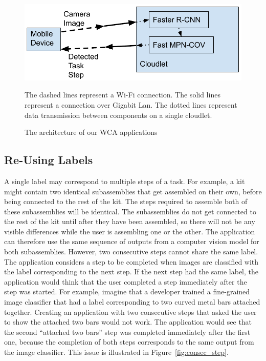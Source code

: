 \begin{figure}
  \includegraphics[width=\columnwidth]{figures/architecture.pdf}
  \begin{captiontext}
    The dashed lines represent a Wi-Fi connection.
    The solid lines represent a connection over Gigabit Lan.
    The dotted lines represent data transmission between components on a single
    cloudlet.
  \end{captiontext}
  \caption{
    The architecture of our WCA applications
  }\label{fig:arch}
\end{figure}

\subsection{Re-Using Labels}

A single label may correspond to multiple steps of a task.
For example, a kit might contain two identical subassemblies that get assembled
on their own, before being connected to the rest of the kit.
The steps required to assemble both of these subassemblies will be identical.
The subassemblies do not get connected to the rest of the kit until after they
have been assembled, so there will not be any visible differences while the user
is assembling one or the other.
The application can therefore use the same sequence of outputs from a computer
vision model for both subassemblies.
However, two consecutive steps cannot share the same label.
The application considers a step to be completed when images are classified with
the label corresponding to the next step.
If the next step had the same label, the application would think that the user
completed a step immediately after the step was started.
For example, imagine that a developer trained a fine-grained image classifier
that had a label corresponding to two curved metal bars attached together.
Creating an application with two consecutive steps that asked the user to show
the attached two bars would not work.
The application would see that the second ``attached two bars'' step was
completed immediately after the first one, because the completion of both steps
corresponds to the same output from the image classifier.
This issue is illustrated in Figure~\ref{fig:consec_step}.

